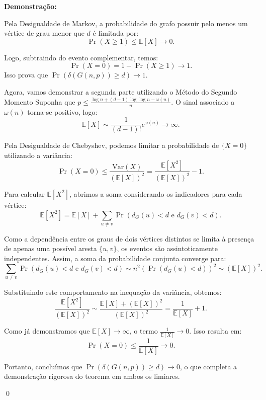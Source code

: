 \documentclass[12pt]{article}
\newenvironment{sol}
    {\textbf{Demonstração:}\emph{}
    }
    {
    \qed
    }
\begin{document}
\begin{sol}
    Pela Desigualdade de Markov, a probabilidade do grafo possuir pelo menos um vértice de grau menor que $d$ é limitada por:
    \[\Pr(X \ge 1) \le \mathbb{E}[X] \to 0.\]

    Logo, subtraindo do evento complementar, temos:
    \[\Pr(X = 0) = 1 - \Pr(X \ge 1) \to 1.\]
    Isso prova que $\Pr(\delta(G(n,p)) \ge d) \to 1$.

    Agora, vamos demonstrar a segunda parte utilizando o Método do Segundo Momento
    Suponha que $p \le \frac{\log n + (d-1)\log\log n - \omega(n)}{n}$. O sinal associado a $\omega(n)$ torna-se positivo, logo:
    \[\mathbb{E}[X] \sim \frac{1}{(d-1)!} e^{\omega(n)} \to \infty.\]

    Pela Desigualdade de Chebyshev, podemos limitar a probabilidade de $\{X = 0\}$ utilizando a variância:
    \[\Pr(X = 0) \le \frac{\text{Var}(X)}{(\mathbb{E}[X])^2} = \frac{\mathbb{E}[X^2]}{(\mathbb{E}[X])^2} - 1.\]

    Para calcular $\mathbb{E}[X^2]$, abrimos a soma considerando os indicadores para cada vértice:
    \[\mathbb{E}[X^2] = \mathbb{E}[X] + \sum_{u \neq v} \Pr(d_G(u) < d \text{ e } d_G(v) < d).\]

    Como a dependência entre os graus de dois vértices distintos se limita à presença de apenas uma possível aresta $\{u,v\}$, os eventos são assintoticamente independentes. 
    Assim, a soma da probabilidade conjunta converge para:
    \[\sum_{u \neq v} \Pr(d_G(u) < d \text{ e } d_G(v) < d) \sim n^2 (\Pr(d_G(u) < d))^2 \sim (\mathbb{E}[X])^2.\]

    Substituindo este comportamento na inequação da variância, obtemos:
    \[\frac{\mathbb{E}[X^2]}{(\mathbb{E}[X])^2} \sim \frac{\mathbb{E}[X] + (\mathbb{E}[X])^2}{(\mathbb{E}[X])^2} = \frac{1}{\mathbb{E}[X]} + 1.\]

    Como já demonstramos que $\mathbb{E}[X] \to \infty$, o termo $\frac{1}{\mathbb{E}[X]} \to 0$. Isso resulta em:
    \[\Pr(X = 0) \le \frac{1}{\mathbb{E}[X]} \to 0.\]

    Portanto, concluímos que $\Pr(\delta(G(n,p)) \ge d) \to 0$, o que completa a demonstração rigorosa do teorema em ambos os limiares.
\end{sol}

\end{document}
